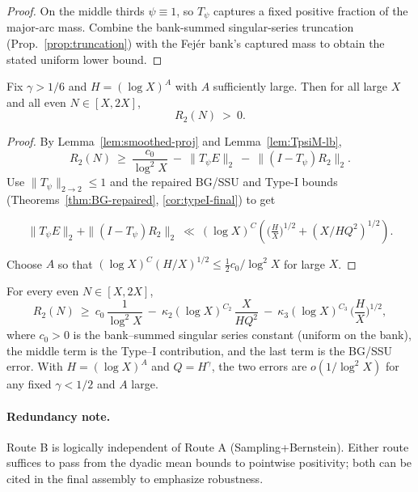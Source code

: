 \begin{proof}
On the middle thirds $\psi\equiv 1$, so $T_\psi$ captures a fixed positive fraction of the major-arc mass. 
Combine the bank-summed singular-series truncation (Prop.~\ref{prop:truncation}) with the Fejér bank’s captured mass to obtain the stated uniform lower bound.
\end{proof}

\begin{theorem}\label{thm:Bprime-pointwise}
Fix $\gamma>1/6$ and $H=(\log X)^A$ with $A$ sufficiently large.
Then for all large $X$ and all even $N\in[X,2X]$,
\[
R_2(N)\ >\ 0.
\]
\end{theorem}

\begin{proof}
By Lemma~\ref{lem:smoothed-proj} and Lemma~\ref{lem:TpsiM-lb},
\[
R_2(N)\ \ge\ \frac{c_0}{\log^2 X}\ -\ \|T_\psi E\|_2\ -\ \|(I-T_\psi)R_2\|_2.
\]
Use $\|T_\psi\|_{2\to2}\le 1$ and the repaired BG/SSU and Type-I bounds (Theorems~\ref{thm:BG-repaired}, \ref{cor:typeI-final}) to get

\[
\|T_\psi E\|_2 + \|(I-T_\psi)R_2\|_2 \ \ll\ (\log X)^{C}(\Big(\tfrac{H}{X}\Big)^{1/2}+(X/HQ^2)^{1/2}).
\]

Choose $A$ so that $(\log X)^{C}(H/X)^{1/2}\le \tfrac12 c_0/\log^2 X$ for large $X$.
\end{proof}

\begin{proposition}\label{prop:routeB}
For every even $N\in[X,2X]$,
\begin{equation}\label{eq:routeB}
R_2(N)\ \ge\ c_0\,\frac{1}{\log^2 X}
\ -\ \kappa_2 (\log X)^{C_2}\,\frac{X}{H Q^2}
\ -\ \kappa_3 (\log X)^{C_3}\,\Big(\frac{H}{X}\Big)^{1/2},
\end{equation}
where $c_0>0$ is the bank–summed singular series constant (uniform on the bank), the middle term is the Type–I contribution, and the last term is the BG/SSU error. With $H=(\log X)^A$ and $Q=H^\gamma$, the two errors are $o(1/\log^2 X)$ for any fixed $\gamma<1/2$ and $A$ large.
\end{proposition}

\paragraph{Redundancy note.}
Route B is logically independent of Route A (Sampling+Bernstein). 
Either route suffices to pass from the dyadic mean bounds to pointwise positivity; both can be cited in the final assembly to emphasize robustness.


